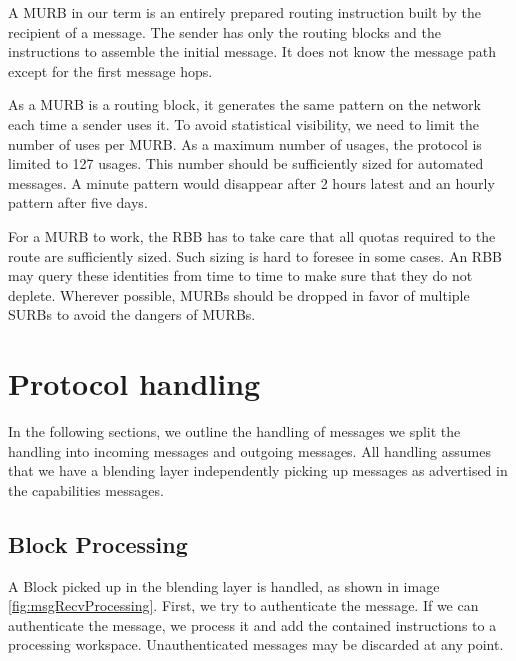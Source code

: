 A MURB in our term is an entirely prepared routing instruction built by the recipient of a message. The sender has only the routing blocks and the instructions to assemble the initial message. It does not know the message path except for the first message hops.

As a MURB is a routing block, it generates the same pattern on the network each time a sender uses it. To avoid statistical visibility, we need to limit the number of uses per MURB. As a maximum number of usages, the protocol is limited to 127 usages. This number should be sufficiently sized for automated messages. A minute pattern would disappear after 2 hours latest and an hourly pattern after five days.

For a MURB to work, the RBB has to take care that all quotas required to the route are sufficiently sized. Such sizing is hard to foresee in some cases. An RBB may query these identities from time to time to make sure that they do not deplete. Wherever possible, MURBs should be dropped in favor of multiple SURBs to avoid the dangers of MURBs.

\section{Protocol handling}
In the following sections, we outline the handling of messages we split the handling into incoming messages and outgoing messages. All handling assumes that we have a blending layer independently picking up messages as advertised in the capabilities messages.

\subsection{Block Processing}
A Block picked up in the blending layer is handled, as shown in image \ref{fig:msgRecvProcessing}. First, we try to authenticate the message. If we can authenticate the message, we process it and add the contained instructions to a processing workspace. Unauthenticated messages may be discarded at any point.

